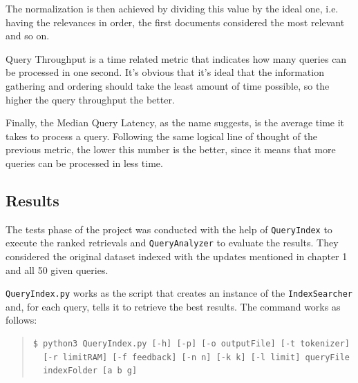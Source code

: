 \documentclass[12pt]{article}
\begin{document}
The normalization is then achieved by dividing this value by the ideal one, i.e.
having the relevances in order, the first documents considered the most relevant 
and so on.

Query Throughput is a time related metric that indicates how many queries can be 
processed in one second. 
It's obvious that it's ideal that the information gathering and ordering should 
take the least amount of time possible, so the higher the query throughput the better.

Finally, the Median Query Latency, as the name suggests, is the average time it
takes to process a query. 
Following the same logical line of thought of the previous metric, the lower 
this number is the better, since it means that more queries can be processed in 
less time.

\subsection{Results}\label{results}

The tests phase of the project was conducted with the help of \texttt{QueryIndex}
to execute the ranked retrievals and \texttt{QueryAnalyzer} to evaluate the results.
They considered the original dataset indexed with the updates mentioned in chapter 
1 and all 50 given queries.

\texttt{QueryIndex.py} works as the script that creates an instance of the 
\texttt{IndexSearcher} and, for each query, tells it to retrieve the best results.
The command works as follows:

\begingroup
\addtolength\leftmargini{-0.4in}
\addtolength\baselineskip{-0.05in}
\begin{quote}
\begin{verbatim}
$ python3 QueryIndex.py [-h] [-p] [-o outputFile] [-t tokenizer] 
  [-r limitRAM] [-f feedback] [-n n] [-k k] [-l limit] queryFile 
  indexFolder [a b g]
\end{verbatim}
\end{quote}
\endgroup
\end{document}
